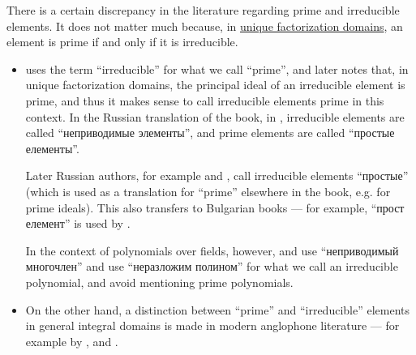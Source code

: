 \begin{remark}\label{rem:prime_and_irreducible_terminology}
  There is a certain discrepancy in the literature regarding prime and irreducible elements. It does not matter much because, in \hyperref[def:unique_factorization_domain]{unique factorization domains}, an element is prime if and only if it is irreducible.

  \begin{itemize}
    \item {} uses the term \enquote{irreducible} for what we call \enquote{prime}, and later notes that, in unique factorization domains, the principal ideal of an irreducible element is prime, and thus it makes sense to call irreducible elements prime in this context. In the Russian translation of the book, in \cite[89]{Костиркин1968Ленг}, irreducible elements are called \enquote{неприводимые элементы}, and prime elements are called \enquote{простые елементы}.

    Later Russian authors, for example  and , call irreducible elements \enquote{простые} (which is used as a translation for \enquote{prime} elsewhere in the book, e.g. for prime ideals). This also transfers to Bulgarian books --- for example, \enquote{прост елемент} is used by .

    In the context of polynomials over fields, however,  and  use \enquote{неприводимый многочлен} and  use \enquote{неразложим полином} for what we call an irreducible polynomial, and avoid mentioning prime polynomials.

    \item On the other hand, a distinction between \enquote{prime} and \enquote{irreducible} elements in general integral domains is made in modern anglophone literature --- for example by ,  and .
  \end{itemize}
\end{remark}

